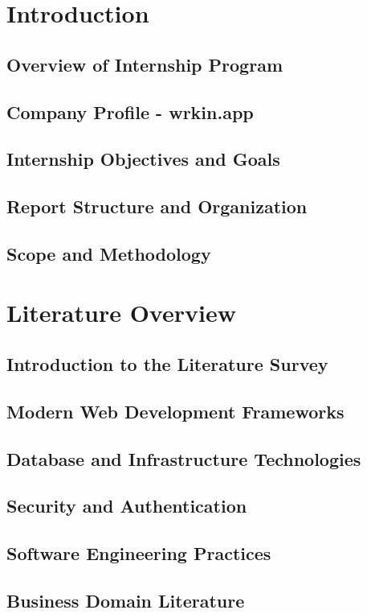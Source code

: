 \documentclass[a4paper, 11pt, oneside]{report}
\begin{document}
\chapter{Introduction}
  \section{Overview of Internship Program}
  \section{Company Profile - wrkin.app}
  \section{Internship Objectives and Goals}
  \section{Report Structure and Organization}
  \section{Scope and Methodology}
  

\chapter{Literature Overview}
  \section{Introduction to the Literature Survey}
  \section{Modern Web Development Frameworks}
  \section{Database and Infrastructure Technologies}
  \section{Security and Authentication}
  \section{Software Engineering Practices}
  \section{Business Domain Literature}
\end{document}
